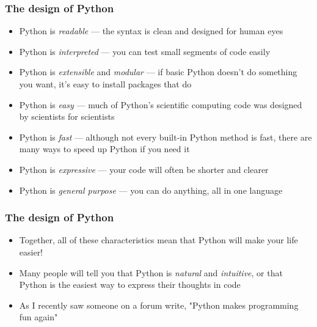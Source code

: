 \documentclass{beamer}\usepackage[]{graphicx}\usepackage[]{color}
\begin{document}
\begin{frame}
\frametitle{The design of Python}

\begin{itemize}
	\item Python is \emph{readable} --- the syntax is clean and designed for human eyes

	\item Python is \emph{interpreted} --- you can test small segments of code easily 

	\item Python is \emph{extensible} and \emph{modular} --- if basic Python doesn't do something you want, it's easy to install packages that do

	\item Python is \emph{easy} --- much of Python's scientific computing code was designed by scientists for scientists

	\item Python is \emph{fast} --- although not every built-in Python method is fast, there are many ways to speed up Python if you need it

	\item Python is \emph{expressive} --- your code will often be shorter and clearer
	
	\item Python is \emph{general purpose} --- you can do anything, all in one language
\end{itemize}
\end{frame}

\begin{frame}
\frametitle{The design of Python}
\begin{itemize}
	\item Together, all of these characteristics mean that Python will make your life easier!

	\item Many people will tell you that Python is \emph{natural} and \emph{intuitive}, or that Python is the easiest way to express their thoughts in code
	
	\item As I recently saw someone on a forum write, "Python makes programming fun again"

\end{itemize}
\end{frame}
\end{document}
